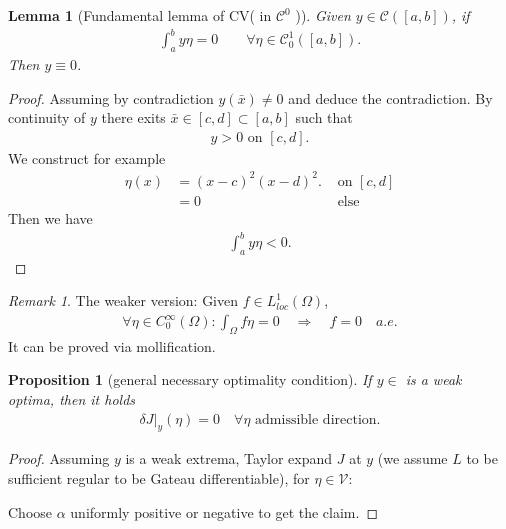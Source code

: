 \documentclass[a4paper,11pt,fleqn]{book}
\newtheorem{lemma}[theorem]{Lemma}
\newtheorem{proposition}[theorem]{Proposition}
\theoremstyle{definition}
\theoremstyle{remark}
\newtheorem*{remark}{Remark}
\begin{document}
\begin{lemma}[Fundamental lemma of CV( in $\mathcal{C}^0$ )]
Given $y \in \mathcal{C}([a, b])$, if 
\begin{align*}
	\int_a^b y \eta = 0 \qquad \forall \eta \in \mathcal{C}^1_0([a, b]).
\end{align*}
Then $y \equiv 0$. 
\end{lemma}
\begin{proof}
	Assuming by contradiction $y(\bar{x}) \neq 0$ and deduce the contradiction. By continuity of $y$ there exits $ \bar{x} \in [c, d ] \subset [a, b]$ such that 
	\begin{align*}
		y > 0 \text{ on } [c, d].
	\end{align*} 
	We construct for example
	\begin{align*}
		\eta(x) &= (x - c)^2 (x - d)^2. &\text{ on $[c, d]$}\\
		&= 0 &\text{ else}
	\end{align*}
	Then we have
	\begin{align*}
		\int_a^b y \eta < 0. 
	\end{align*}
\end{proof}
\begin{remark}
The weaker version:
Given $f \in L^1_{loc}(\Omega)$, 
\begin{align*}
	\forall \eta \in C_0^\infty(\Omega): \int_\Omega f \eta = 0 \quad\Rightarrow \quad f = 0\quad a.e.
\end{align*}
It can be proved via mollification. 	
\end{remark}

\begin{proposition}[general necessary optimality condition]
	If $y \in $ is a weak optima, then it holds 
	\begin{align*}
		\delta J|_y(\eta) = 0 \quad \forall \eta \text{ admissible direction.} 
	\end{align*}
\end{proposition}
\begin{proof}
	Assuming $y$ is a weak extrema, Taylor expand $J$ at $y$ (we assume $L$ to be sufficient regular to be Gateau differentiable), for $\eta \in \mathcal{V}$: 

	Choose $\alpha$ uniformly positive or negative to get the claim.
\end{proof}
\end{document}
